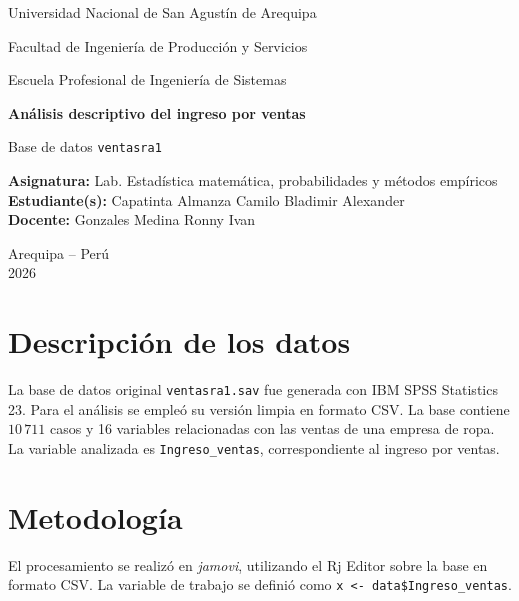 \documentclass[12pt,letterpaper]{article}
\begin{document}
\begin{titlepage}
\centering
\vspace*{2cm}
{\Large Universidad Nacional de San Agustín de Arequipa\par}
\vspace{0.4cm}
{\large Facultad de Ingeniería de Producción y Servicios\par}
\vspace{0.4cm}
{\large Escuela Profesional de Ingeniería de Sistemas\par}
\vfill
{\Huge\bfseries Análisis descriptivo del ingreso por ventas\par}
\vspace{0.5cm}
{\Large Base de datos \texttt{ventasra1}\par}
\vfill
\begin{flushleft}
\large
\textbf{Asignatura:} Lab. Estadística matemática, probabilidades y métodos empíricos\\[0.4cm]
\textbf{Estudiante(s):} Capatinta Almanza Camilo Bladimir Alexander\\[0.4cm]
\textbf{Docente:} Gonzales Medina Ronny Ivan 
\end{flushleft}
\vfill
{\large Arequipa -- Perú\\2026\par}
\end{titlepage}

\clearpage
{}
\tableofcontents
\clearpage

\section{Descripción de los datos}

La base de datos original \texttt{ventasra1.sav} fue generada con IBM SPSS Statistics 23. Para el análisis se empleó su versión limpia en formato CSV. La base contiene $10\,711$ casos y 16 variables relacionadas con las ventas de una empresa de ropa. La variable analizada es \texttt{Ingreso\_ventas}, correspondiente al ingreso por ventas.

\section{Metodología}

El procesamiento se realizó en \textit{jamovi}, utilizando el Rj Editor sobre la base en formato CSV. La variable de trabajo se definió como \texttt{x <- data\$Ingreso\_ventas}.
\end{document}

